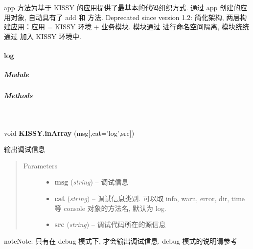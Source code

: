 \documentclass[letterpaper,10pt,english]{sphinxmanual}
\begin{document}
app 方法为基于 KISSY 的应用提供了最基本的代码组织方式. 通过 app 创建的应用对象, 自动具有了 add 和  方法.
Deprecated since version 1.2: 简化架构, 两层构建应用：应用 = KISSY 环境 + 业务模块. 模块通过 {\hyperref[api/seed/loader/index:module-Loader]{}} 进行命名空间隔离,
模块统统通过  加入 KISSY 环境中.

\paragraph{log}
\label{api/seed/kissy/log::doc}\label{api/seed/kissy/log:log}

\subparagraph{Module}
\label{api/seed/kissy/log:module}\begin{quote}

{\hyperref[api/seed/kissy/index:module-Seed]{}}
\end{quote}


\subparagraph{Methods}
\label{api/seed/kissy/log:methods}

\begin{fulllineitems}
\label{api/seed/kissy/log:Seed.KISSY.log}~
\begin{DUlineblock}{0em}
\item[] void \textbf{KISSY.inArray} (msg{[},cat='log',src{]})
\item[] 输出调试信息
\end{DUlineblock}
\begin{quote}\begin{description}
\item[{Parameters}] \leavevmode\begin{itemize}
\item {}
\textbf{msg} (\emph{string}) -- 调试信息

\item {}
\textbf{cat} (\emph{string}) -- 调试信息类别. 可以取 info, warn, error, dir, time 等 console 对象的方法名, 默认为 log.

\item {}
\textbf{src} (\emph{string}) -- 调试代码所在的源信息

\end{itemize}

\end{description}\end{quote}

\begin{notice}{note}{Note:}
只有在 debug 模式下, 才会输出调试信息. debug 模式的说明请参考 {\hyperref[api/seed/kissy/Config:Seed.KISSY.Config]{}}
\end{notice}

\end{fulllineitems}
\end{document}
